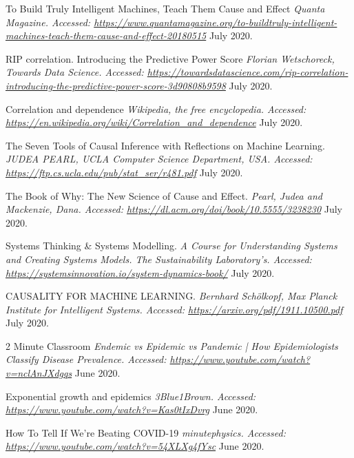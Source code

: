 \let\cleardoublepage\clearpage
\cleardoublepage
{}


\begin{thebibliography}{1}
\vspace*{15pt}


 To Build Truly Intelligent Machines, Teach Them Cause and Effect {\em Quanta Magazine. Accessed:  \url{https://www.quantamagazine.org/to-buildtruly-intelligent-machines-teach-them-cause-and-effect-20180515}} July 2020.

 RIP correlation. Introducing the Predictive Power Score {\em Florian Wetschoreck, Towards Data Science. Accessed:  \url{https://towardsdatascience.com/rip-correlation-introducing-the-predictive-power-score-3d90808b9598}} July 2020.

 Correlation and dependence {\em Wikipedia, the free encyclopedia. Accessed:  \url{https://en.wikipedia.org/wiki/Correlation_and_dependence}} July 2020.

 The Seven Tools of Causal Inference with Reflections on Machine Learning. {\em JUDEA PEARL, UCLA Computer Science Department, USA. Accessed:  \url{https://ftp.cs.ucla.edu/pub/stat_ser/r481.pdf}} July 2020.

 The Book of Why: The New Science of Cause and Effect. {\em Pearl, Judea and Mackenzie, Dana. Accessed:  \url{https://dl.acm.org/doi/book/10.5555/3238230}} July 2020.

 Systems Thinking & Systems Modelling. {\em A Course for Understanding Systems and Creating Systems Models. The Sustainability Laboratory’s. Accessed:  \url{https://systemsinnovation.io/system-dynamics-book/}} July 2020.

 CAUSALITY FOR MACHINE LEARNING. {\em Bernhard Schölkopf, Max Planck Institute for Intelligent Systems. Accessed:  \url{https://arxiv.org/pdf/1911.10500.pdf}} July 2020.

 2 Minute Classroom {\em Endemic vs Epidemic vs Pandemic | How Epidemiologists Classify Disease Prevalence. Accessed:  \url{https://www.youtube.com/watch?v=nclAnJXdgqs}} June 2020.

 Exponential growth and epidemics {\em 3Blue1Brown. Accessed:  \url{https://www.youtube.com/watch?v=Kas0tIxDvrg}} June 2020.

 How To Tell If We're Beating COVID-19 {\em 
minutephysics. Accessed:  \url{https://www.youtube.com/watch?v=54XLXg4fYsc}} June 2020.


\end{thebibliography}
